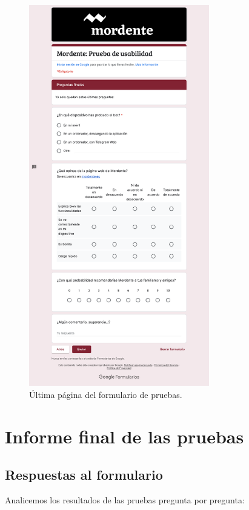 \begin{figure}[h]
\centering
\includegraphics[width=0.7\textwidth]{imagenes/pruebas/form_4.png}
\caption{Última página del formulario de pruebas.}
\label{fig:form4}
\end{figure}

\section{Informe final de las pruebas}

\subsection{Respuestas al formulario}

Analicemos los resultados de las pruebas pregunta por pregunta:

